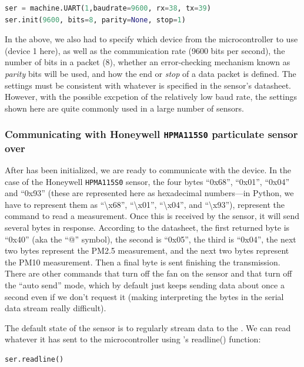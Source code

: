 \begin{lstlisting}[language=Python]
ser = machine.UART(1,baudrate=9600, rx=38, tx=39)
ser.init(9600, bits=8, parity=None, stop=1)
\end{lstlisting}

In the above, we also had to specify which \uart device from the microcontroller to use (device 1 here), as well as the communication rate (9600 bits per second), the number of bits in a packet (8), whether an error-checking mechanism known as \emph{parity} bits will be used, and how the end or \emph{stop} of a data packet is defined.
The settings must be consistent with whatever is specified in the sensor's datasheet.
However, with the possible excpetion of the relatively low baud rate, the settings shown here are quite commonly used in a large number of sensors.

\subsubsection{Communicating with Honeywell \texttt{HPMA115S0} particulate sensor over \uart}

After \uart has been initialized, we are ready to communicate with the device.
In the case of the Honeywell \texttt{HPMA115S0} sensor, the four bytes “0x68”, “0x01”, “0x04” and “0x93” (these are represented here as hexadecimal numbers—in Python, we have to represent them as “\textbackslash x68”, “\textbackslash x01”, “\textbackslash x04”, and “\textbackslash x93”), represent the command to read a measurement.
Once this is received by the sensor, it will send several bytes in response.
According to the datasheet, the first returned byte  is “0x40” (aka the “@” symbol), the second is “0x05”, the third is “0x04”, the next two bytes represent the PM2.5 measurement, and the next two bytes represent the PM10 measurement.
Then a final byte is sent finishing the transmission.
There are other commands that turn off the fan on the sensor and that turn off the “auto send” mode, which by default just keeps sending data about once a second even if we don’t request it (making interpreting the bytes in the serial data stream really difficult).

The default state of the sensor is to regularly stream data to the \uart.
We can read whatever it has sent to the microcontroller using \Micropython's readline() function: 

\begin{lstlisting}[language=Python]
ser.readline()
\end{lstlisting}

